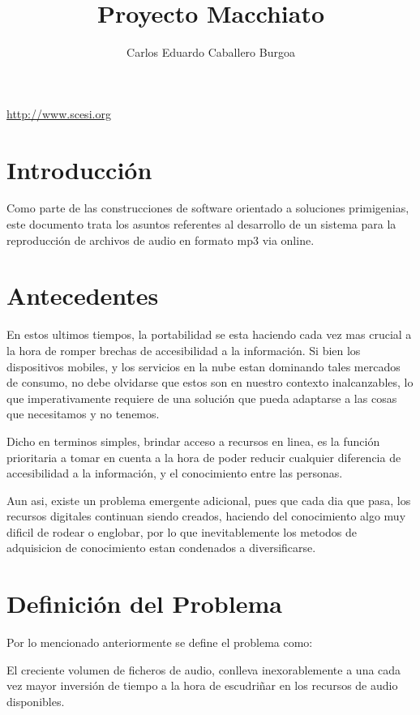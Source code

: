 \documentclass[letter,12pt]{article}
\title{\bf Proyecto Macchiato}
\author{Carlos Eduardo Caballero Burgoa}
\begin{document}
\maketitle
\begin{center}\url {http://www.scesi.org}\end{center}
\pagebreak

\tableofcontents
\pagebreak

\section{Introducción}
Como parte de las construcciones de software orientado a soluciones primigenias, este documento
trata los asuntos referentes al desarrollo de un sistema para la reproducción de archivos de audio
en formato mp3 via online.

\section{Antecedentes}
En estos ultimos tiempos, la portabilidad se esta haciendo cada vez mas crucial a la hora de romper
brechas de accesibilidad a la información. Si bien los dispositivos mobiles, y los servicios en la nube
estan dominando tales mercados de consumo, no debe olvidarse que estos son en nuestro contexto
inalcanzables, lo que imperativamente requiere de una solución que pueda adaptarse a las cosas que
necesitamos y no tenemos.

Dicho en terminos simples, brindar acceso a recursos en linea, es la función prioritaria a tomar en
cuenta a la hora de poder reducir cualquier diferencia de accesibilidad a la información, y el
conocimiento entre las personas.

Aun asi, existe un problema emergente adicional, pues que cada dia que pasa, los recursos digitales
continuan siendo creados, haciendo del conocimiento algo muy dificil de rodear o englobar, por lo que
inevitablemente los metodos de adquisicion de conocimiento estan condenados a diversificarse.

\section{Definición del Problema}
Por lo mencionado anteriormente se define el problema como:

El creciente volumen de ficheros de audio, conlleva inexorablemente a una cada vez mayor inversión de
tiempo a la hora de escudriñar en los recursos de audio disponibles.
\end{document}
